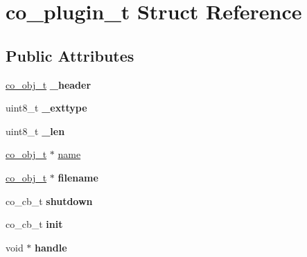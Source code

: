 \hypertarget{structco__plugin__t}{\section{co\+\_\+plugin\+\_\+t Struct Reference}
\label{structco__plugin__t}
}
\subsection*{Public Attributes}
\begin{DoxyCompactItemize}
\item 
\hypertarget{structco__plugin__t_ab0a2a4ad013802de52d8ba25148af417}{\hyperlink{structco__obj__t}{co\+\_\+obj\+\_\+t} {\bfseries \+\_\+header}}\label{structco__plugin__t_ab0a2a4ad013802de52d8ba25148af417}

\item 
\hypertarget{structco__plugin__t_ad3f325009c9a219de2d1840aa7893792}{uint8\+\_\+t {\bfseries \+\_\+exttype}}\label{structco__plugin__t_ad3f325009c9a219de2d1840aa7893792}

\item 
\hypertarget{structco__plugin__t_af4b68a1316b0bd48a57b989f2c5f524d}{uint8\+\_\+t {\bfseries \+\_\+len}}\label{structco__plugin__t_af4b68a1316b0bd48a57b989f2c5f524d}

\item 
\hyperlink{structco__obj__t}{co\+\_\+obj\+\_\+t} $\ast$ \hyperlink{structco__plugin__t_a6d404dac4735db73f208778f2eddd1e2}{name}
\item 
\hypertarget{structco__plugin__t_aa52a04c70682cf44cf948d89c7e88a10}{\hyperlink{structco__obj__t}{co\+\_\+obj\+\_\+t} $\ast$ {\bfseries filename}}\label{structco__plugin__t_aa52a04c70682cf44cf948d89c7e88a10}

\item 
\hypertarget{structco__plugin__t_a31c3e83b38d4bd779866e881f0efa256}{co\+\_\+cb\+\_\+t {\bfseries shutdown}}\label{structco__plugin__t_a31c3e83b38d4bd779866e881f0efa256}

\item 
\hypertarget{structco__plugin__t_a0c945cde5526c9f41bdbae97108f74c3}{co\+\_\+cb\+\_\+t {\bfseries init}}\label{structco__plugin__t_a0c945cde5526c9f41bdbae97108f74c3}

\item 
\hypertarget{structco__plugin__t_aee2e2a81038a12ee1146f5c8293ea491}{void $\ast$ {\bfseries handle}}\label{structco__plugin__t_aee2e2a81038a12ee1146f5c8293ea491}

\end{DoxyCompactItemize}


